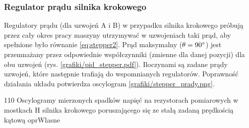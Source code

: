 \subsubsection{Regulator prądu silnika krokowego}

Regulatory prądu (dla uzwojeń A i B) w przypadku silnika krokowego próbują przez cały okres pracy maszyny utrzymywać w uzwojeniach taki prąd, aby spełnione było równanie \ref{eq:stepper2}. Prąd maksymalny ($ \theta = 90\degree $) jest przemnażany przez odpowiednie współczynniki (zmienne dla danej pozycji) dla obu uzwojeń (rys. \ref{grafiki/pid_stepper.pdf}). Iloczynami są zadane prądy uzwojeń, które następnie trafiają do wspomnianych regulatorów. Poprawność działania układu potwierdza oscylogram \ref{grafiki/stepper_prady.png}.

	{110}
	{Oscylogramy mierzonych spadków napięć na rezystorach pomiarowych w mostkach H silnika krokowego poruszającego się ze stałą zadaną prędkością kątową}
	{oprWlasne}



\clearpage